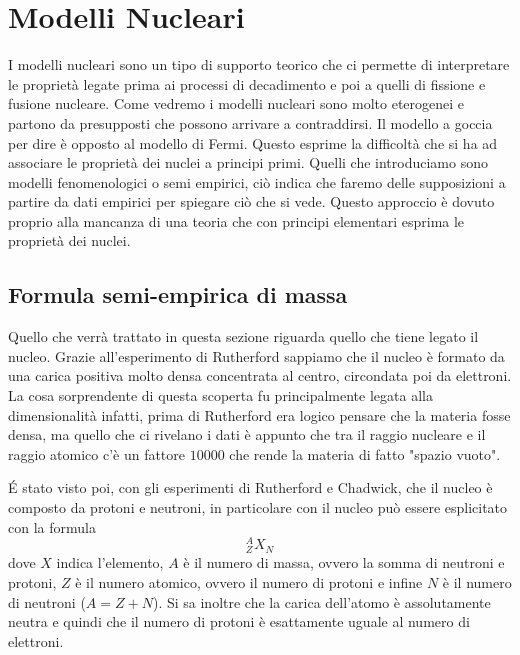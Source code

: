 
\section{Modelli Nucleari}
I modelli nucleari sono un tipo di supporto teorico che ci permette di interpretare le proprietà legate prima ai processi di decadimento e poi a quelli di fissione e fusione nucleare.
Come vedremo i modelli nucleari sono molto eterogenei e partono da presupposti che possono arrivare a contraddirsi.
Il modello a goccia per dire è opposto al modello di Fermi.
Questo esprime la difficoltà che si ha ad associare le proprietà dei nuclei a principi primi.
Quelli che introduciamo sono modelli fenomenologici o semi empirici, ciò indica che faremo delle supposizioni a partire da dati empirici per spiegare ciò che si vede.
Questo approccio è dovuto proprio alla mancanza di una teoria che con principi elementari esprima le proprietà dei nuclei.

\subsection{Formula semi-empirica di massa}
Quello che verrà trattato in questa sezione riguarda quello che tiene legato il nucleo. 
Grazie all'esperimento di Rutherford sappiamo che il nucleo è formato da una carica positiva molto densa concentrata al centro, circondata poi da elettroni.
La cosa sorprendente di questa scoperta fu principalmente legata alla dimensionalità infatti, prima di Rutherford era logico pensare che la materia fosse densa, ma quello che ci rivelano i dati è appunto che tra il raggio nucleare e il raggio atomico c'è un fattore $10000$ che rende la materia di fatto "spazio vuoto".

\'E stato visto poi, con gli esperimenti di Rutherford e Chadwick, che il nucleo è composto da protoni e neutroni, in particolare con il nucleo può essere esplicitato con la formula
\begin{equation}
^{A}_{Z}X_{N}
\end{equation}
dove $X$ indica l'elemento, $A$ è il numero di massa, ovvero la somma di neutroni e protoni, $Z$ è il numero atomico, ovvero il numero di protoni e infine $N$ è il numero di neutroni ($A=Z+N$).
Si sa inoltre che la carica dell'atomo è assolutamente neutra e quindi che il numero di protoni è esattamente uguale al numero di elettroni.

